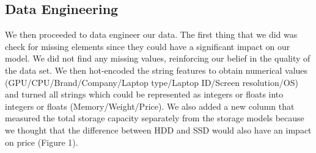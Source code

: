 \documentclass{article}
\begin{document}
\subsection{Data Engineering}

We then proceeded to data engineer our data. The first thing that we did was check for missing elements since they could have a significant impact on our model. We did not find any missing values, reinforcing our belief in the quality of the data set. We then hot-encoded the string features to obtain numerical values (GPU/CPU/Brand/Company/Laptop type/Laptop ID/Screen resolution/OS) and turned all strings which could be represented as integers or floats into integers or floats (Memory/Weight/Price). We also added a new column that measured the total storage capacity separately from the storage models because we thought that the difference between HDD and SSD would also have an impact on price (Figure 1).
\end{document}
